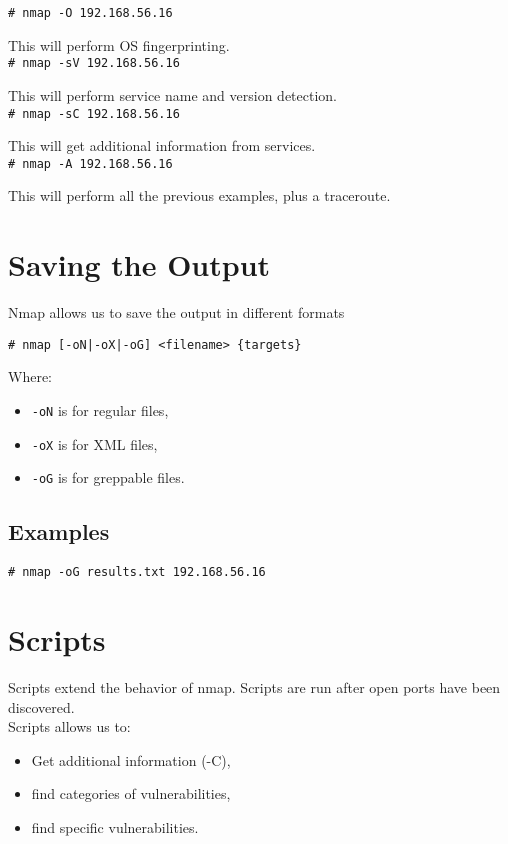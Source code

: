 \documentclass[twocolumn]{article}
\begin{document}
\texttt{\# nmap -O 192.168.56.16}

This will perform OS fingerprinting.\\

\texttt{\# nmap -sV 192.168.56.16}

This will perform service name and version detection.\\

\texttt{\# nmap -sC 192.168.56.16}

This will get additional information from services.\\

\texttt{\# nmap -A 192.168.56.16}

This will perform all the previous examples, plus a traceroute.

\section{Saving the Output}

Nmap allows us to save the output in different formats

\texttt{\# nmap [-oN|-oX|-oG] <filename> \{targets\}}

Where:

\begin{itemize}
    \item \texttt{-oN} is for regular files,
    \item \texttt{-oX} is for XML files,
    \item \texttt{-oG} is for greppable files.
\end{itemize}

\subsection{Examples}

\texttt{\# nmap -oG results.txt 192.168.56.16}

\section{Scripts}

Scripts extend the behavior of nmap. Scripts are run after open ports have been discovered.\\

Scripts allows us to:

\begin{itemize}
    \item Get additional information (-C),
    \item find categories of vulnerabilities,
    \item find specific vulnerabilities.
\end{itemize}
\end{document}
